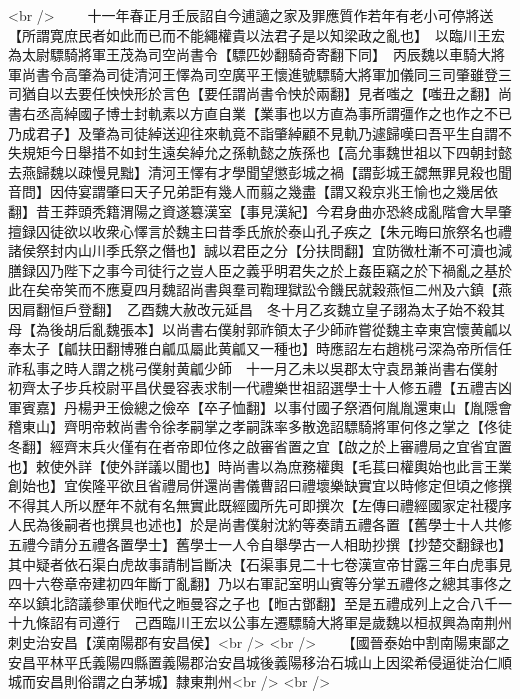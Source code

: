 <br />
　　十一年春正月壬辰詔自今逋讁之家及罪應質作若年有老小可停將送【所謂寛庶民者如此而已而不能繩權貴以法君子是以知梁政之亂也】　以臨川王宏為太尉驃騎將軍王茂為司空尚書令【驃匹妙翻騎奇寄翻下同】　丙辰魏以車騎大將軍尚書令高肇為司徒清河王懌為司空廣平王懷進號驃騎大將軍加儀同三司肇雖登三司猶自以去要任怏怏形於言色【要任謂尚書令怏於兩翻】見者嗤之【嗤丑之翻】尚書右丞高綽國子博士封軌素以方直自業【業事也以方直為事所謂彊作之也作之不已乃成君子】及肇為司徒綽送迎往來軌竟不詣肇綽顧不見軌乃遽歸嘆曰吾平生自謂不失規矩今日舉措不如封生遠矣綽允之孫軌懿之族孫也【高允事魏世祖以下四朝封懿去燕歸魏以疎慢見黜】清河王懌有才學聞望懲彭城之禍【謂彭城王勰無罪見殺也聞音問】因侍宴謂肇曰天子兄弟詎有幾人而翦之幾盡【謂又殺京兆王愉也之幾居依翻】昔王莽頭秃籍渭陽之資遂簒漢室【事見漢紀】今君身曲亦恐終成亂階會大旱肇擅録囚徒欲以收衆心懌言於魏主曰昔季氏旅於泰山孔子疾之【朱元晦曰旅祭名也禮諸侯祭封内山川季氏祭之僭也】誠以君臣之分【分扶問翻】宜防微杜漸不可瀆也減膳録囚乃陛下之事今司徒行之豈人臣之義乎明君失之於上姦臣竊之於下禍亂之基於此在矣帝笑而不應夏四月魏詔尚書與羣司鞫理獄訟令饑民就穀燕恒二州及六鎮【燕因肩翻恒戶登翻】　乙酉魏大赦改元延昌　冬十月乙亥魏立皇子詡為太子始不殺其母【為後胡后亂魏張本】以尚書右僕射郭祚領太子少師祚嘗從魏主幸東宫懷黄㼐以奉太子【㼐扶田翻博雅白㼐瓜屬此黄㼐又一種也】時應詔左右趙桃弓深為帝所信任祚私事之時人謂之桃弓僕射黄㼐少師　十一月乙未以吳郡太守袁昂兼尚書右僕射　初齊太子步兵校尉平昌伏曼容表求制一代禮樂世祖詔選學士十人修五禮【五禮吉凶軍賓嘉】丹楊尹王儉總之儉卒【卒子恤翻】以事付國子祭酒何胤胤還東山【胤隱會稽東山】齊明帝敕尚書令徐孝嗣掌之孝嗣誅率多散逸詔驃騎將軍何佟之掌之【佟徒冬翻】經齊末兵火僅有在者帝即位佟之啟審省置之宜【啟之於上審禮局之宜省宜置也】敕使外詳【使外詳議以聞也】時尚書以為庶務權輿【毛萇曰權輿始也此言王業創始也】宜俟隆平欲且省禮局併還尚書儀曹詔曰禮壞樂缺實宜以時修定但頃之修撰不得其人所以歷年不就有名無實此既經國所先可即撰次【左傳曰禮經國家定社稷序人民為後嗣者也撰具也述也】於是尚書僕射沈約等奏請五禮各置【舊學士十人共修五禮今請分五禮各置學士】舊學士一人令自舉學古一人相助抄撰【抄楚交翻録也】其中疑者依石渠白虎故事請制旨斷决【石渠事見二十七卷漢宣帝甘露三年白虎事見四十六卷章帝建初四年斷丁亂翻】乃以右軍記室明山賓等分掌五禮佟之總其事佟之卒以鎮北諮議參軍伏暅代之暅曼容之子也【暅古鄧翻】至是五禮成列上之合八千一十九條詔有司遵行　己酉臨川王宏以公事左遷驃騎大將軍是歲魏以桓叔興為南荆州刺史治安昌【漢南陽郡有安昌侯】<br />
<br />
　　【國晉泰始中割南陽東鄙之安昌平林平氏義陽四縣置義陽郡治安昌城後義陽移治石城山上因梁希侵逼徙治仁順城而安昌則俗謂之白茅城】隸東荆州<br />
<br />
